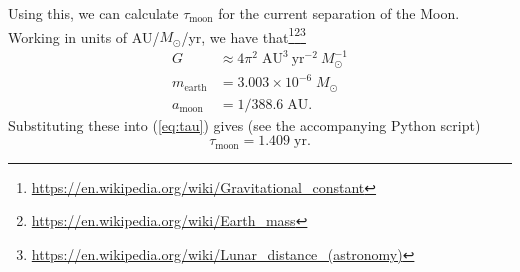 \documentclass[11pt]{article}
\begin{document}
Using this, we can calculate $\tau_{\mathrm{moon}}$ for the current separation of the Moon. Working in units of AU/$M_\odot$/yr, we have that\footnote{\url{https://en.wikipedia.org/wiki/Gravitational\_constant}}\footnote{\url{https://en.wikipedia.org/wiki/Earth\_mass}}\footnote{\url{https://en.wikipedia.org/wiki/Lunar\_distance\_(astronomy)}}
\begin{align*}
    G &\approx 4 \pi^2 \; \mathrm{AU}^3 \: \mathrm{yr}^{-2} \: M_\odot^{-1} \\
    m_{\mathrm{earth}} &= 3.003 \times 10^{-6} \; M_\odot \\
    a_{\mathrm{moon}} &= 1/388.6 \; \mathrm{AU}.
\end{align*}
Substituting these into (\ref{eq:tau}) gives (see the accompanying Python script)
\[
    \tau_{\mathrm{moon}} = 1.409 \; \mathrm{yr}.
\]

\printbibliography
\end{document}
